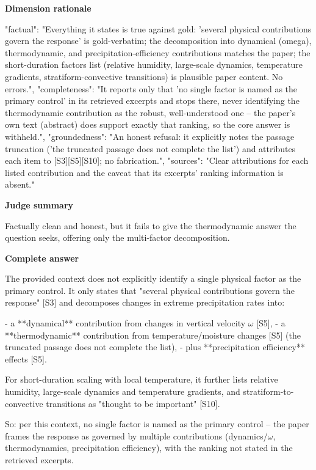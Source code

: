 \documentclass[10pt]{article}
\begin{document}
\textbf{Dimension rationale}
\begin{EvidenceText}
{
  "factual": "Everything it states is true against gold: 'several physical contributions govern the response' is gold-verbatim; the decomposition into dynamical (omega), thermodynamic, and precipitation-efficiency contributions matches the paper; the short-duration factors list (relative humidity, large-scale dynamics, temperature gradients, stratiform-convective transitions) is plausible paper content. No errors.",
  "completeness": "It reports only that 'no single factor is named as the primary control' in its retrieved excerpts and stops there, never identifying the thermodynamic contribution as the robust, well-understood one -- the paper's own text (abstract) does support exactly that ranking, so the core answer is withheld.",
  "groundedness": "An honest refusal: it explicitly notes the passage truncation ('the truncated passage does not complete the list') and attributes each item to [S3][S5][S10]; no fabrication.",
  "sources": "Clear attributions for each listed contribution and the caveat that its excerpts' ranking information is absent."
}
\end{EvidenceText}

\textbf{Judge summary}
\begin{EvidenceText}
Factually clean and honest, but it fails to give the thermodynamic answer the question seeks, offering only the multi-factor decomposition.
\end{EvidenceText}

\textbf{Complete answer}
\begin{AnswerText}
The provided context does not explicitly identify a single physical factor as the primary control. It only states that "several physical contributions govern the response" [S3] and decomposes changes in extreme precipitation rates into:

- a **dynamical** contribution from changes in vertical velocity $\omega$ [S5],
- a **thermodynamic** contribution from temperature/moisture changes [S5] (the truncated passage does not complete the list),
- plus **precipitation efficiency** effects [S5].

For short-duration scaling with local temperature, it further lists relative humidity, large-scale dynamics and temperature gradients, and stratiform-to-convective transitions as "thought to be important" [S10].

So: per this context, no single factor is named as the primary control -- the paper frames the response as governed by multiple contributions (dynamics/$\omega$, thermodynamics, precipitation efficiency), with the ranking not stated in the retrieved excerpts.
\end{AnswerText}
\end{document}
